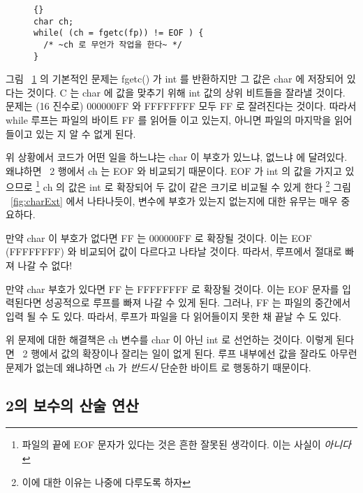 \begin{figure}[t]
\begin{lstlisting}[stepnumber=0,frame=tlrb,escapeinside=~~]{}
char ch;
while( (ch = fgetc(fp)) != EOF ) {
  /* ~ch 로 무언가 작업을 한다~ */
}
\end{lstlisting}
\caption{}
\label{fig:IObug}
\end{figure}

그림 ~\ref{fig:IObug} 의 기본적인 문제는 {\code fgetc()} 가 
{\code int} 를 반환하지만 그 값은 {\code char} 에 저장되어 있다는 것이다. C 는 {\code char}
에 값을 맞추기 위해 {\code int} 값의 상위 비트들을 잘라낼 것이다. 문제는
(16 진수로) {\code 000000FF} 와 {\code FFFFFFFF} 모두 {\code FF} 로 잘려진다는 것이다.
따라서 while 루프는 파일의 바이트 {\code FF} 를 읽어들
이고 있는지, 아니면 파일의 마지막을 읽어들이고 있는 지 알 수 없게 된다.

위 상황에서 코드가 어떤 일을 하느냐는 {\code char} 이 부호가 있느냐, 없느냐
에 달려있다. 왜냐하면 ~2 행에서 {\code ch} 는 {\code EOF} 와 비교되기 때문이다.
{\code EOF} 가 {\code int} 의 값을 가지고 있으므로 
\footnote{파일의 끝에 EOF 문자가 있다는 것은 흔한 잘못된 생각이다. 이는 사실이
\emph{아니다}} {\code ch} 의 값은 {\code int} 
로 확장되어 두 값이 같은 크기로 비교될 수 있게 한다 \footnote{이에 대한 이유는
나중에 다루도록 하자} 그림 ~\ref{fig:charExt} 에서 나타나듯이, 변수에 부호가 있는지
없는지에 대한 유무는 매우 중요하다. 

만약 {\code char} 이 부호가 없다면 {\code FF} 는 {\code 000000FF} 로 확장될 것이다.
이는 {\code EOF} ({\code FFFFFFFF}) 와 비교되어 값이 다르다고 나타날 것이다. 따라서, 
루프에서 절대로 빠져 나갈 수 없다! 

만약 {\code char} 부호가 있다면 {\code FF} 는 {\code FFFFFFFF} 로 확장될 것이다. 이는
EOF 문자를 입력된다면 성공적으로 루프를 빠져 나갈 수 있게 된다. 그러나, {\code FF} 는 
파일의 중간에서 입력 될 수 도 있다. 따라서, 루프가 파일을 다 읽어들이지 못한 채 끝날
수 도 있다.

위 문제에 대한 해결책은 {\code ch} 변수를 {\code char} 이 아닌 {\code int} 로 선언하는
것이다. 이렇게 된다면 ~2 행에서 값의 확장이나 잘리는 일이 없게 된다. 루프 내부에선 
값을 잘라도 아무런 문제가 없는데 왜냐하면 {\code ch} 가 \emph{반드시} 단순한 바이트
로 행동하기 때문이다. 



\subsection{2의 보수의 산술 연산 }

